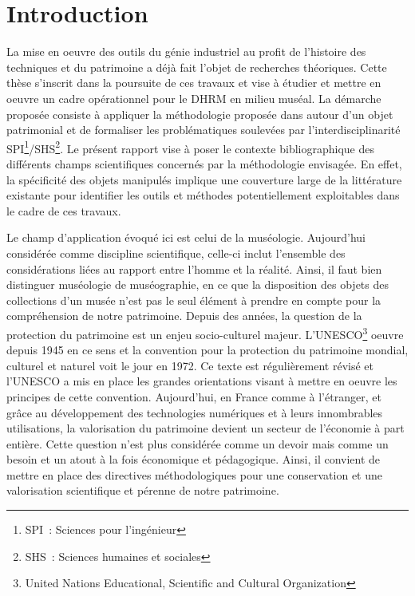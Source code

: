 \documentclass[a4paper,11pt,french]{article}
\begin{document}
\newpage
\tableofcontents
\newpage
\section{Introduction}

La mise en oeuvre des outils du génie industriel au profit de l'histoire des techniques et du patrimoine a déjà fait l'objet de recherches théoriques\cite{Laroche2007}. Cette thèse s'inscrit dans la poursuite de ces travaux et vise à étudier et mettre en oeuvre un cadre opérationnel pour le DHRM en milieu muséal.
La démarche proposée consiste à appliquer la méthodologie proposée dans \cite{Laroche2007} autour d'un objet patrimonial et de formaliser les problématiques soulevées par l'interdisciplinarité SPI\footnote{SPI~: Sciences pour l'ingénieur}/SHS\footnote{SHS~: Sciences humaines et sociales}.
Le présent rapport vise à poser le contexte bibliographique des différents champs scientifiques concernés par la méthodologie envisagée. En effet, la spécificité des objets manipulés implique une couverture large de la littérature existante pour identifier les outils et méthodes potentiellement exploitables dans le cadre de ces travaux.

Le champ d'application évoqué ici est celui de la muséologie. Aujourd'hui considérée comme discipline scientifique, celle-ci inclut l'ensemble des considérations liées au rapport entre l'homme et la réalité\cite{Desvallees2005}.
Ainsi, il faut bien distinguer muséologie de muséographie, en ce que la disposition des objets des collections d'un musée n'est pas le seul élément à prendre en compte pour la compréhension
de notre patrimoine. Depuis des années, la question de la protection du patrimoine est un enjeu socio-culturel majeur. L'UNESCO\footnote{United Nations Educational, Scientific and Cultural Organization} oeuvre depuis
1945 en ce sens et la convention pour la protection du patrimoine mondial, culturel et naturel voit le jour en 1972. Ce texte est régulièrement révisé et l'UNESCO a mis en place les grandes orientations
visant à mettre en oeuvre les principes de cette convention\cite{Unesco2008}.
Aujourd'hui, en France comme à l'étranger, et grâce au développement des technologies numériques et à leurs innombrables utilisations, la valorisation du patrimoine devient un secteur de l'économie à part entière\cite{CAE2011}. Cette question
n'est plus considérée comme un devoir mais comme un besoin et un atout à la fois économique et pédagogique.
Ainsi, il convient de mettre en place des directives méthodologiques pour une conservation et une valorisation scientifique et pérenne de notre patrimoine\cite{LAROCHE-2008-422162}.
\end{document}
